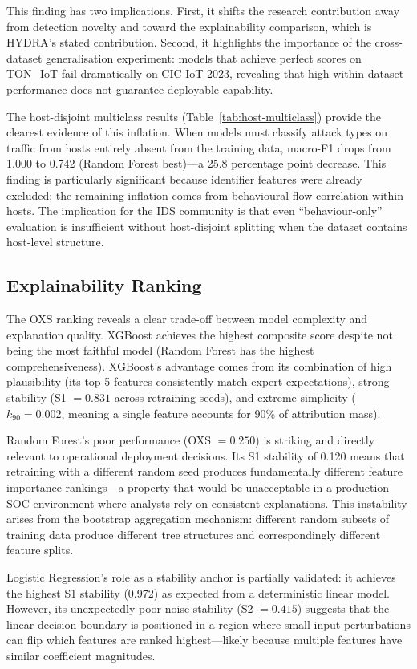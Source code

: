 \documentclass[12pt,a4paper]{report}
\begin{document}
This finding has two implications. First, it shifts the research contribution away from detection novelty and toward the explainability comparison, which is HYDRA's stated contribution. Second, it highlights the importance of the cross-dataset generalisation experiment: models that achieve perfect scores on TON\_IoT fail dramatically on CIC-IoT-2023, revealing that high within-dataset performance does not guarantee deployable capability.

The host-disjoint multiclass results (Table~\ref{tab:host-multiclass}) provide the clearest evidence of this inflation. When models must classify attack types on traffic from hosts entirely absent from the training data, macro-F1 drops from 1.000 to 0.742 (Random Forest best)---a 25.8 percentage point decrease. This finding is particularly significant because identifier features were already excluded; the remaining inflation comes from behavioural flow correlation within hosts. The implication for the IDS community is that even ``behaviour-only'' evaluation is insufficient without host-disjoint splitting when the dataset contains host-level structure.

\subsection*{Explainability Ranking}

The OXS ranking reveals a clear trade-off between model complexity and explanation quality. XGBoost achieves the highest composite score despite not being the most faithful model (Random Forest has the highest comprehensiveness). XGBoost's advantage comes from its combination of high plausibility (its top-5 features consistently match expert expectations), strong stability (S1 $= 0.831$ across retraining seeds), and extreme simplicity ($k_{90} = 0.002$, meaning a single feature accounts for 90\% of attribution mass).

Random Forest's poor performance (OXS $= 0.250$) is striking and directly relevant to operational deployment decisions. Its S1 stability of 0.120 means that retraining with a different random seed produces fundamentally different feature importance rankings---a property that would be unacceptable in a production SOC environment where analysts rely on consistent explanations. This instability arises from the bootstrap aggregation mechanism: different random subsets of training data produce different tree structures and correspondingly different feature splits.

Logistic Regression's role as a stability anchor is partially validated: it achieves the highest S1 stability (0.972) as expected from a deterministic linear model. However, its unexpectedly poor noise stability (S2 $= 0.415$) suggests that the linear decision boundary is positioned in a region where small input perturbations can flip which features are ranked highest---likely because multiple features have similar coefficient magnitudes.
\end{document}
